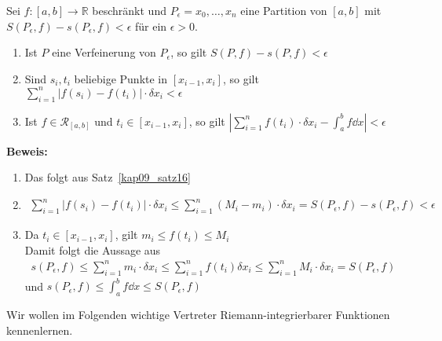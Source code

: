 \begin{Satz}{\label{kap10_satz19}
	Sei $f:[a,b] \rightarrow \mathbb{R}$ beschränkt und $P_{\epsilon} = 
	{x_0, \hdots, x_n}$ eine Partition von $[a,b]$ mit $S(P_{\epsilon},f) -
	s(P_{\epsilon},f) < \epsilon$ für ein $\epsilon > 0$.
	\begin{enumerate}
		\item Ist $P$ eine Verfeinerung von $P_{\epsilon}$, so gilt 
		$S(P,f) - s(P,f) < \epsilon$
		\item Sind $s_i, t_i$ beliebige Punkte in $[x_{i-1},x_i]$, so gilt 
		$\sum_{i=1}^n \left\vert f(s_i) - f(t_i) \right\vert \cdot \delta x_i 
		< \epsilon$
		\item Ist $f \in \mathcal{R}_{[a,b]}$ und $t_i \in [x_{i-1},x_i]$, so 
		gilt 
		$\left\vert \sum_{i=1}^n f(t_i) \cdot \delta x_i - \int_a^b f \dd{x} 
		\right\vert < \epsilon$ 
	\end{enumerate}	 
	\textbf{Beweis:}
	\begin{enumerate}
		\item Das folgt aus Satz~\ref{kap09_satz16}
		
		\item
		 \begin{align*}
			\sum_{i = 1}^n \left\vert f(s_i) - f(t_i) \right\vert	\cdot 
			\delta x_i \leq \sum_{i=1}^n (M_i-m_i)\cdot \delta x_i
			= S(P_{\epsilon},f) - s(P_{\epsilon},f) < \epsilon
		 \end{align*}
		 \item Da $t_i \in [x_{i-1},x_i]$, gilt $m_i \leq f(t_i) \leq M_i$ \\
		 	Damit folgt die Aussage aus
			 \begin{align*}
			 	s(P_{\epsilon},f ) \leq  
			 	\sum_{i = 1}^n m_i \cdot \delta x_i \leq \sum_{i=1}^n f(t_i) \delta 
			 	x_i \leq \sum_{i=1}^n M_i \cdot \delta x_i = S(P_{\epsilon},f)
			 \end{align*}
			 und $s(P_{\epsilon},f) \leq \int_a^b f \dd{x} \leq S(P_{\epsilon},f)$
	\end{enumerate}
	Wir wollen im Folgenden wichtige Vertreter Riemann-integrierbarer 
	Funktionen kennenlernen.
}\end{Satz}

